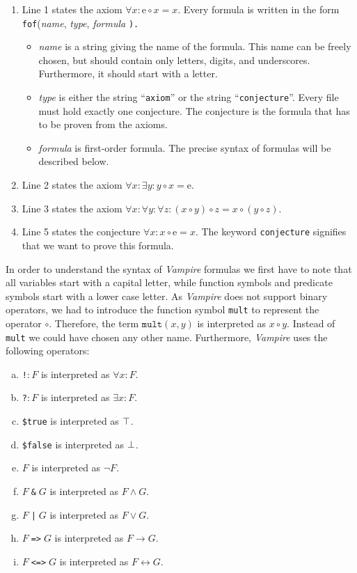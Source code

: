 \begin{enumerate}
\item Line 1 states the axiom $\forall x: \mathrm{e} \circ x = x$.  Every formula is written in the form
      \\[0.2cm]
      \hspace*{1.3cm}
      \texttt{fof}(\textsl{name}, \textsl{type}, \textsl{formula} \texttt{).}
      \begin{itemize}
      \item \textsl{name} is a string giving the name of the formula.  This name can be freely chosen,
            but should contain only letters, digits, and underscores.  Furthermore, it should start with a letter.
      \item \textsl{type} is either the string ``\texttt{axiom}'' or the string ``\texttt{conjecture}''.
            Every file must hold exactly one conjecture.  The conjecture is the formula that has to be proven from the
            axioms.
      \item \textsl{formula} is first-order formula.  The precise syntax of formulas will be described below.
      \end{itemize}
\item Line 2 states the axiom $\forall x: \exists y: y \circ x = \mathrm{e}$.
\item Line 3 states the axiom $\forall x: \forall y: \forall z: (x \circ y) \circ z = x \circ (y \circ z)$.
\item Line 5 states the conjecture $\forall x: x \circ \mathrm{e} = x$.  The keyword \texttt{conjecture}
      signifies that we want to prove this formula.  
\end{enumerate}
In order to understand the syntax of \textsl{Vampire} formulas we first have to note that all variables start
with a capital letter, while function symbols and predicate symbols start with a lower case letter.  As
\textsl{Vampire} does not support binary operators, we had to introduce the function symbol \texttt{mult} to
represent the operator $\circ$.  Therefore, the term $\mathtt{mult}(x, y)$ is interpreted as $x \circ y$.
Instead of \texttt{mult} we could have chosen any other name.  Furthermore, \textsl{Vampire} uses the following
operators:
\begin{enumerate}[(a)]
\item \texttt{!\;[X]}$:F$ is interpreted as $\forall x: F$.
\item \texttt{?\;[X]}$:F$ is interpreted as $\exists x:F$.
\item \texttt{\$true} is interpreted as $\top$.
\item \texttt{\$false} is interpreted as $\bot$.
\item \texttt{}$F$ is interpreted as $\neg F$.
\item $F\;$\texttt{\&}$\;G$ is interpreted as $F \wedge G$.
\item $F\;$\texttt{|}$\;G$ is interpreted as $F \vee G$.
\item $F\;$\texttt{=>}$\;G$ is interpreted as $F \rightarrow G$.
\item $F\;$\texttt{<=>}$\;G$ is interpreted as $F \leftrightarrow G$.
\end{enumerate}
